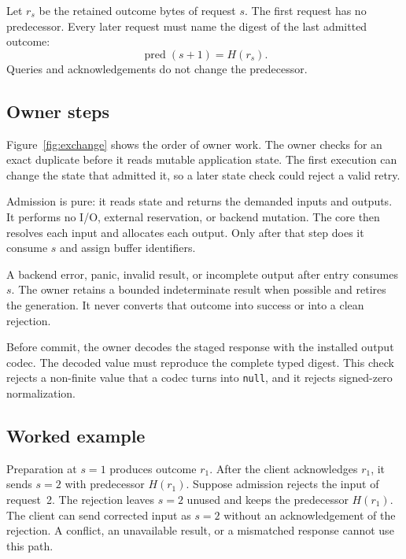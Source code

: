 \documentclass[11pt,a4paper]{article}
\theoremstyle{definition}
\let\NcpTextttBase\texttt
\renewcommand{\texttt}[1]{\mbox{\NcpTextttBase{#1}}}
\newcommand{\Hash}{H}
\begin{document}
Let $r_s$ be the retained outcome bytes of request $s$. The first request has no
predecessor. Every later request must name the digest of the last admitted outcome:
\begin{equation}\label{eq:predecessor}
\operatorname{pred}(s+1)=\Hash(r_s).
\end{equation}
Queries and acknowledgements do not change the predecessor.

\subsection{Owner steps}

Figure~\ref{fig:exchange} shows the order of owner work. The owner checks for an exact
duplicate before it reads mutable application state. The first execution can change
the state that admitted it, so a later state check could reject a valid retry.


Admission is pure: it reads state and returns the demanded inputs and outputs. It
performs no I/O, external reservation, or backend mutation. The core then resolves each
input and allocates each output. Only after that step does it consume $s$ and assign
buffer identifiers.

A backend error, panic, invalid result, or incomplete output after entry consumes $s$.
The owner retains a bounded indeterminate result when possible and retires the
generation. It never converts that outcome into success or into a clean rejection.

Before commit, the owner decodes the staged response with the installed output codec.
The decoded value must reproduce the complete typed digest. This check rejects a
non-finite value that a codec turns into \texttt{null}, and it rejects signed-zero
normalization.

\subsection{Worked example}

Preparation at $s=1$ produces outcome $r_1$. After the client acknowledges $r_1$, it
sends $s=2$ with predecessor $\Hash(r_1)$. Suppose admission rejects the input of
request~2. The rejection leaves $s=2$ unused and keeps the predecessor $\Hash(r_1)$.
The client can send corrected input as $s=2$ without an acknowledgement of the
rejection. A conflict, an unavailable result, or a mismatched response cannot use this
path.
\end{document}

